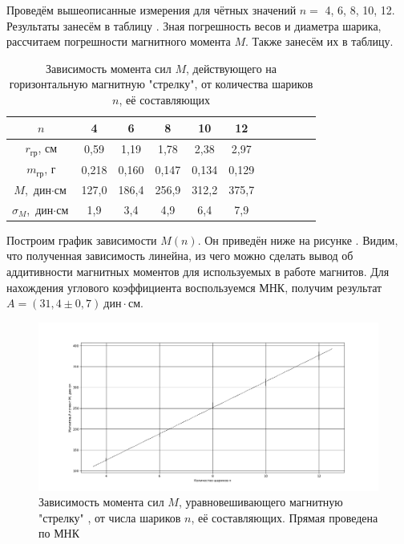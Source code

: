 \documentclass[a4paper,10pt]{article}
\begin{document}
Проведём вышеописанные измерения для чётных значений $n=$ 4, 6, 8, 10, 12. Результаты занесём в таблицу . Зная погрешность весов и диаметра шарика, рассчитаем погрешности магнитного момента $M$. Также занесём их в таблицу.

\begin{table}[h]
	\centering
	\caption{Зависимость момента сил $M$, действующего на горизонтальную магнитную "стрелку", от количества шариков $n$, её составляющих} \label{ravn}
	\begin{tabular}{|c|c|c|c|c|c|c|c|c|c|c|}
		\hline
		$n$ & 4 & 6 & 8 & 10 & 12 \\ \hline
		$r_{\text{гр}}$, см & 0,59 & 1,19 & 1,78 & 2,38 & 2,97 \\ \hline
		$m_{\text{гр}}$, г & 0,218 & 0,160 & 0,147 & 0,134 & 0,129 \\ \hline
		$M$, $\text{дин}\cdot\text{см}$ & 127,0 & 186,4 & 256,9 & 312,2 & 375,7 \\ \hline
		$\sigma_M$, $\text{дин}\cdot\text{см}$ & 1,9 & 3,4 & 4,9 & 6,4 & 7,9 \\ \hline
	\end{tabular}
\end{table}

Построим график зависимости $M(n)$. Он приведён ниже на рисунке . Видим, что полученная зависимость линейна, из чего можно сделать вывод об аддитивности магнитных моментов для используемых в работе магнитов. Для нахождения углового коэффициента воспользуемся МНК, получим результат $A=\left(31,4\pm0,7\right)~\text{дин}\cdot\text{см}$.

\begin{figure}[h]
	\centering
	\includegraphics[scale = 0.33]{plott}
	\caption{Зависимость момента сил $M$, уравновешивающего магнитную "стрелку" , от числа шариков $n$, её составляющих. Прямая проведена по МНК} \label{plott}
\end{figure} 
\end{document}
